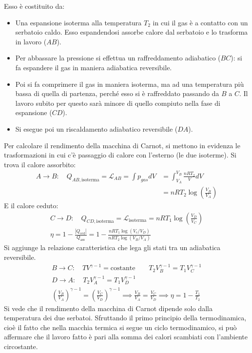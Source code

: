 \documentclass[10pt,a4paper]{book}
\begin{document}
\FloatBarrier
Esso è costituito da:
\begin{itemize}
	\item Una espansione isoterma alla temperatura $T_2$ in cui il gas è a contatto con un serbatoio caldo. Esso espandendosi assorbe calore dal serbatoio e lo trasforma in lavoro ($AB$).
	\item Per abbassare la pressione si effettua un raffreddamento adiabatico ($BC$): si fa espandere il gas in maniera adiabatica reversibile.
	\item Poi si fa comprimere il gas in maniera isoterma, ma ad una temperatura più bassa di quella di partenza, perché esso si è raffreddato passando da $B$ a $C$. Il lavoro subito per questo sarà minore di quello compiuto nella fase di espansione ($CD$).
	\item Si esegue poi un riscaldamento adiabatico reversibile ($DA$).
\end{itemize}
Per calcolare il rendimento della macchina di Carnot, si mettono in evidenza le trasformazioni in cui c'è passaggio di calore con l'esterno (le due isoterme).
Si trova il calore assorbito:
\begin{align*}
	A\to B:\quad Q_{AB,\text{isoterma} } = \mathcal{L}_{AB} = \int p_{gas}dV &= \int_{V_A }^{V_B } \frac{nRT_2 }{V}dV \\
	&= nRT_2\log \left( \frac{V_B }{V_A } \right)
\end{align*}
E il calore ceduto:
\begin{gather*}
	C\to D:\quad Q_{CD,\text{isoterma}} = \mathcal{L}_{\text{isoterma} } = nRT_1\log \left( \frac{V_D }{V_C } \right) \\
	\eta = 1-\frac{|Q_{\text{ced} } |}{Q_{\text{ass} } } = 1 - \frac{nRT_1\log (V_c/V_D  ) }{nRT_2\log (V_B/V_A) }
\end{gather*}
Si aggiunge la relazione caratteristica che lega gli stati tra un adiabatica reversibile.
\begin{gather*}
	B\to C:\quad TV^{\gamma -1}=\text{costante} \qquad T_2 V_B^{\gamma -1}=T_1 V_C^{\gamma -1} \\
	D\to A:\quad T_2 V_A^{\gamma -1} = T_1 V_D^{\gamma -1} \\
	\left( \frac{V_B }{V_A } \right)^{\gamma -1} = \left( \frac{V_C }{V_D } \right)^{\gamma -1} \implies \frac{V_B }{V_A }=\frac{V_C }{V_D } \implies \boxed{\eta = 1-\frac{T_1 }{T_2 }}
\end{gather*}
Si vede che il rendimento della macchina di Carnot dipende solo dalla temperatura dei due serbatoi. Sfruttando il primo principio della termodinamica, cioè il fatto che nella macchia termica si segue un ciclo termodinamico, si può affermare che il lavoro fatto è pari alla somma dei calori scambiati con l'ambiente circostante.
\end{document}
